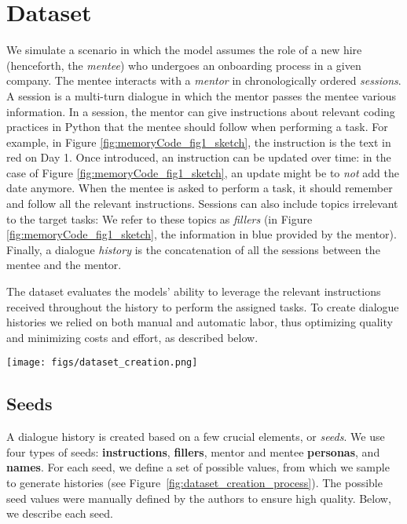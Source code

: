 \section{Dataset}
\label{sec:data}
We simulate a scenario in which the model assumes the role of a new hire (henceforth, the \textit{mentee}) who undergoes an onboarding process in a given company. 
The mentee interacts with a \textit{mentor} in chronologically ordered \textit{sessions}. A session is a multi-turn dialogue in which the mentor passes the mentee various information.
In a session, the mentor can give instructions about relevant coding practices in Python that the mentee should follow when performing a task. For example, in Figure \ref{fig:memoryCode_fig1_sketch}, the instruction is the text in red on Day 1.
Once introduced, an instruction can be updated over time: in the case of Figure \ref{fig:memoryCode_fig1_sketch}, an update might be to  \textit{not} add the date anymore. 
When the mentee is asked to perform a task, it should remember and follow all the relevant instructions. 
Sessions can also include topics irrelevant to the target tasks: We refer to these topics as \textit{fillers} (in Figure \ref{fig:memoryCode_fig1_sketch}, the information in blue provided by the mentor).
Finally, a dialogue \textit{history} is the concatenation of all the sessions between the mentee and the mentor.

The dataset evaluates the models' ability to leverage the relevant instructions received throughout the history to perform the assigned tasks. 
To create dialogue histories we relied on both manual and automatic labor, thus optimizing quality and minimizing costs and effort, as described below. 

\begin{figure*}[t]
    \centering
    \texttt{[image: figs/dataset\_creation.png]}
    \caption{Dataset generation process. First, we randomly sample from our seeds to fill the variables of the template. The LLM is then prompted with this template to generate the dialogue history.}
    \label{fig:dataset_creation_process}
\end{figure*}

\subsection{Seeds}
\label{subsec:seeds}

A dialogue history is created based on a few crucial elements, or \textit{seeds}. We use four types of seeds:  
\textbf{instructions}, 
\textbf{fillers}, mentor and mentee \textbf{personas}, and \textbf{names}. 
For each seed, we define a set of possible values, from which we sample to generate histories (see Figure~\ref{fig:dataset_creation_process}). %
The possible seed values were manually defined by the authors to ensure high quality. Below, we describe each seed.


